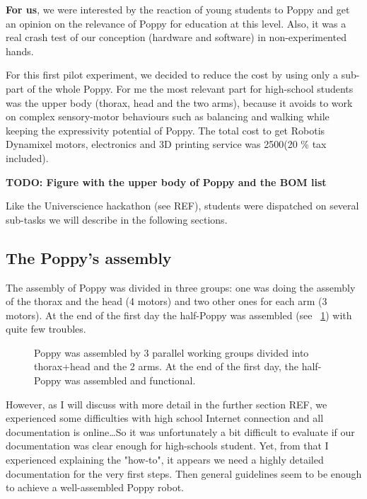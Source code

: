 \textbf{For us}, we were interested by the reaction of young students to Poppy and get an opinion on the relevance of Poppy for education at this level. Also, it was a real crash test of our conception (hardware and software) in non-experimented hands.

For this first pilot experiment, we decided to reduce the cost by using only a sub-part of the whole Poppy. For me the most relevant part for high-school students was the upper body (thorax, head and the two arms), because it avoids to work on complex sensory-motor behaviours such as balancing and walking while keeping the expressivity potential of Poppy. The total cost to get Robotis Dynamixel motors, electronics and 3D printing service was 2500\texteuro (20 \% tax included).

\textbf{TODO: Figure with the upper body of Poppy and the BOM list}

Like the Universcience hackathon (see REF), students were dispatched on several sub-tasks we will describe in the following sections.


\subsection{The Poppy's assembly} %

The assembly of Poppy was divided in three groups: one was doing the assembly of the thorax and the head (4 motors) and two other ones for each arm (3 motors). At the end of the first day the half-Poppy was assembled (see \figurename~\ref{fig:saintonge_assembly}) with quite few troubles.

\begin{figure}[h!]
\centering
    \hfil
    \hfil
    \hfil
    \caption{Poppy was assembled by 3 parallel working groups divided into thorax+head and the 2 arms. At the end of the first day, the half-Poppy was assembled and functional. }
    \label{fig:saintonge_assembly}
\end{figure}

However, as I will discuss with more detail in the further section REF, we experienced some difficulties with high school Internet connection and all documentation is online\dots So it was unfortunately a bit difficult to evaluate if our documentation was clear enough for high-schools student. Yet, from that I experienced explaining the "how-to", it appears we need a highly detailed documentation for the very first steps. Then general guidelines seem to be enough to achieve a well-assembled Poppy robot.



